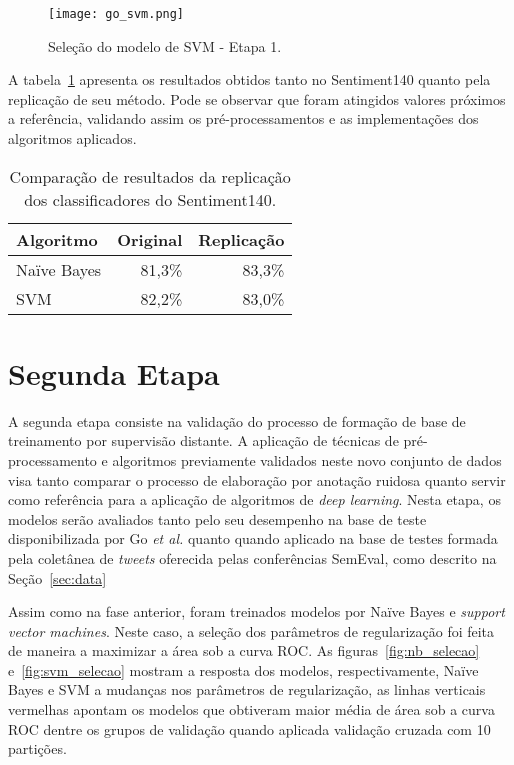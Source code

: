 \begin{figure}
\begin{center} {
    \begin{center}
    \texttt{[image: go\_svm.png]}
    \caption{Seleção do modelo de SVM - Etapa 1.}
    \label{fig:go_svm}
    \end{center}
}
\end{center}
\end{figure}

A tabela~\ref{tab:go_compara} apresenta os resultados obtidos tanto no Sentiment140 quanto pela replicação de
seu método.
Pode se observar que foram atingidos valores próximos a referência, validando assim os pré-processamentos e as
implementações dos algoritmos aplicados.

\begin{table}[h]
    \begin{center}
        \begin{tabular}{| l | r | r |}
        \hline
        \textbf{Algoritmo} & \textbf{Original} & \textbf{Replicação} \\ \hline
        Naïve Bayes & 81,3\% & 83,3\% \\ \hline
        SVM &  82,2\% & 83,0\% \\ \hline
        \end{tabular}
        \caption{Comparação de resultados da replicação dos classificadores do Sentiment140.}
        \label{tab:go_compara}
    \end{center}
\end{table}

\section{Segunda Etapa}

A segunda etapa consiste na validação do processo de formação de base de treinamento por supervisão distante.
A aplicação de técnicas de pré-processamento e algoritmos previamente validados neste novo conjunto de dados visa tanto
comparar o processo de elaboração por anotação ruidosa quanto servir como referência para a aplicação de algoritmos de
\textit{deep learning}.
Nesta etapa, os modelos serão avaliados tanto pelo seu desempenho na base de teste disponibilizada por Go
\textit{et al.} quanto quando aplicado na base de testes formada pela coletânea de \textit{tweets} oferecida pelas
conferências SemEval, como descrito na Seção~\ref{sec:data}

Assim como na fase anterior, foram treinados modelos por Naïve Bayes e \textit{support vector machines}.
Neste caso, a seleção dos parâmetros de regularização foi feita de maneira a maximizar a área sob a curva ROC.
As figuras~\ref{fig:nb_selecao} e~\ref{fig:svm_selecao} mostram a resposta dos modelos, respectivamente, Naïve Bayes e
SVM a mudanças nos parâmetros de regularização, as linhas verticais vermelhas apontam os modelos que obtiveram maior
média de área sob a curva ROC dentre os grupos de validação quando aplicada validação cruzada com 10 partições.

